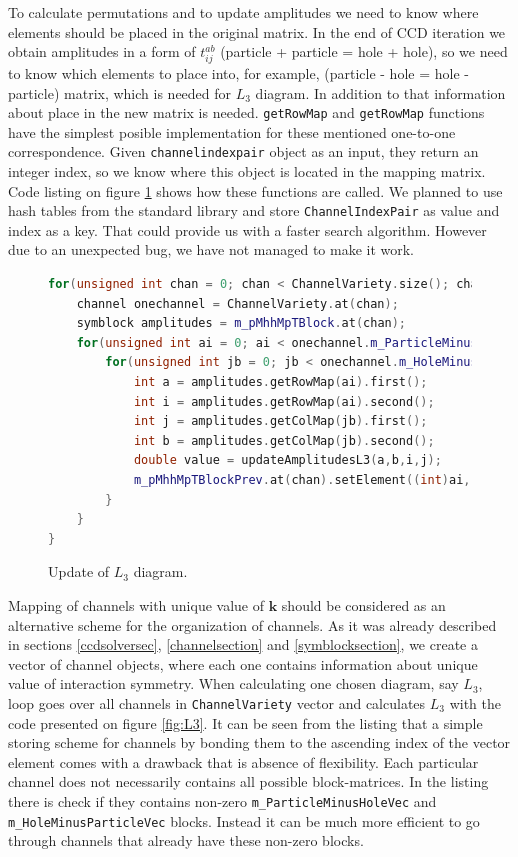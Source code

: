 \documentclass[twoside,english]{uiofysmaster}
\newcommand{\classname}[1]{\texttt{#1}}
\begin{document}
To calculate permutations and to update amplitudes we need to know where elements should be placed in the original matrix. In the end of CCD iteration we obtain amplitudes in a form of $t_{ij}^{ab}$ (particle + particle = hole + hole), so we need to know which elements to place into, for example, (particle - hole = hole - particle) matrix, which is needed for $L_3$ diagram. In addition to that information about place in the new matrix is needed. \classname{getRowMap} and \classname{getRowMap} functions have the simplest posible implementation for these mentioned one-to-one correspondence. Given \classname{channelindexpair} object as an input, they return an integer index, so we know where this object is located in the mapping matrix. Code listing on figure \ref{fig:L3update} shows how these functions are called.
We planned to use hash tables from the standard library and store \classname{ChannelIndexPair} as value and index as a key. That could provide us with a faster search algorithm. However due to an unexpected bug, we have not managed to make it work.
\begin{figure}
\begin{lstlisting}[language=C++]
for(unsigned int chan = 0; chan < ChannelVariety.size(); chan++){
 	channel onechannel = ChannelVariety.at(chan);
   	symblock amplitudes = m_pMhhMpTBlock.at(chan);
   	for(unsigned int ai = 0; ai < onechannel.m_ParticleMinusHoleVec.size(); ai++){
   		for(unsigned int jb = 0; jb < onechannel.m_HoleMinusParticleVec.size(); jb++){
   			int a = amplitudes.getRowMap(ai).first();
   			int i = amplitudes.getRowMap(ai).second();
   			int j = amplitudes.getColMap(jb).first();
   			int b = amplitudes.getColMap(jb).second();
   			double value = updateAmplitudesL3(a,b,i,j);
   			m_pMhhMpTBlockPrev.at(chan).setElement((int)ai, (int)jb, value);
   		}
   	}
}
\end{lstlisting}
\caption{Update of $L_3$ diagram.}\label{fig:L3update}
\end{figure}

Mapping of channels with unique value of $\mathbf{k}$ should be considered as an alternative scheme for the organization of channels.
As it was already described in sections \ref{ccdsolversec}, \ref{channelsection} and \ref{symblocksection}, we create a vector of channel objects, where each one contains information about unique value of interaction symmetry. When calculating one chosen diagram, say $L_3$, loop goes over all channels in \classname{ChannelVariety} vector and calculates $L_3$ with the code presented on figure \ref{fig:L3}. It can be seen from the listing that a simple storing scheme for channels by bonding them to the ascending index of the vector element comes with a drawback that is absence of flexibility. Each particular channel does not necessarily contains all possible block-matrices. In the listing there is check if they contains non-zero \classname{m_ParticleMinusHoleVec} and \classname{m_HoleMinusParticleVec} blocks. Instead it can be much more efficient to go through channels that already have these non-zero blocks.
\end{document}
